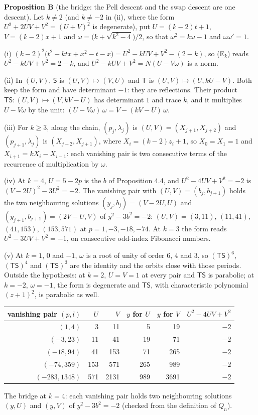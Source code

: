 \documentclass[11pt]{article}
\begin{document}
\noindent\textbf{Proposition B} (the bridge: the Pell descent and the swap descent are one descent). Let $k\ne2$ (and $k\ne-2$ in (ii), where the form $U^2+2UV+V^2=(U+V)^2$ is degenerate), put $U=(k-2)t+1$, $V=(k-2)x+1$ and $\omega=\bigl(k+\sqrt{k^2-4}\bigr)/2$, so that $\omega^2=k\omega-1$ and $\omega\omega'=1$.

(i) $(k-2)^2\bigl(t^2-ktx+x^2-t-x\bigr)=U^2-kUV+V^2-(2-k)$, so (E$_k$) reads $U^2-kUV+V^2=2-k$, and $U^2-kUV+V^2=N(U-V\omega)$ is a norm.

(ii) In $(U,V)$, $\mathsf{S}$ is $(U,V)\mapsto(V,U)$ and $\mathsf{T}$ is $(U,V)\mapsto(U,kU-V)$. Both keep the form and have determinant $-1$: they are reflections. Their product $\mathsf{T}\mathsf{S}:(U,V)\mapsto(V,kV-U)$ has determinant $1$ and trace $k$, and it multiplies $U-V\omega$ by the unit: $(U-V\omega)\,\omega=V-(kV-U)\,\omega$.

(iii) For $k\ge3$, along the chain, $(p_j,\lambda_j)$ is $(U,V)=(X_{j+1},X_{j+2})$ and $(p_{j+1},\lambda_j)$ is $(X_{j+2},X_{j+1})$, where $X_i=(k-2)z_i+1$, so $X_0=X_1=1$ and $X_{i+1}=kX_i-X_{i-1}$: each vanishing pair is two consecutive terms of the recurrence of multiplication by $\omega$.

(iv) At $k=4$, $U=5-2p$ is the $b$ of Proposition 4.4, and $U^2-4UV+V^2=-2$ is $(V-2U)^2-3U^2=-2$. The vanishing pair with $(U,V)=(b_j,b_{j+1})$ holds the two neighbouring solutions $(y_j,b_j)=(V-2U,U)$ and $(y_{j+1},b_{j+1})=(2V-U,V)$ of $y^2-3b^2=-2$: $(U,V)=(3,11)$, $(11,41)$, $(41,153)$, $(153,571)$ at $p=1,-3,-18,-74$. At $k=3$ the form reads $U^2-3UV+V^2=-1$, on consecutive odd-index Fibonacci numbers.

(v) At $k=1$, $0$ and $-1$, $\omega$ is a root of unity of order $6$, $4$ and $3$, so $(\mathsf{T}\mathsf{S})^6$, $(\mathsf{T}\mathsf{S})^4$ and $(\mathsf{T}\mathsf{S})^3$ are the identity and the orbits close with those periods. Outside the hypothesis: at $k=2$, $U=V=1$ at every pair and $\mathsf{T}\mathsf{S}$ is parabolic; at $k=-2$, $\omega=-1$, the form is degenerate and $\mathsf{T}\mathsf{S}$, with characteristic polynomial $(z+1)^2$, is parabolic as well.

\smallskip
\begin{center}
\small
\begin{tabular}{rrrrrr}
vanishing pair $(p,l)$ & $U$ & $V$ & $y$ for $U$ & $y$ for $V$ & $U^2-4UV+V^2$\\
\hline
$(1,4)$ & 3 & 11 & 5 & 19 & $-2$\\
$(-3,23)$ & 11 & 41 & 19 & 71 & $-2$\\
$(-18,94)$ & 41 & 153 & 71 & 265 & $-2$\\
$(-74,359)$ & 153 & 571 & 265 & 989 & $-2$\\
$(-283,1348)$ & 571 & 2131 & 989 & 3691 & $-2$\\
\end{tabular}

\smallskip
The bridge at $k=4$: each vanishing pair holds two neighbouring solutions $(y,U)$ and $(y,V)$ of $y^2-3b^2=-2$ (checked from the definition of $Q_n$).
\end{center}
\end{document}
